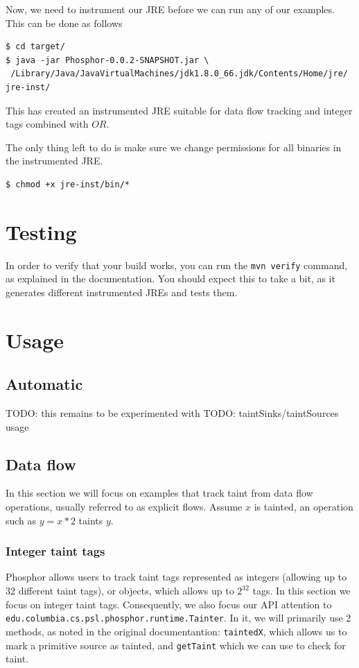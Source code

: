 \documentclass[a4paper]{article}
\begin{document}
Now, we need to instrument our JRE before we can run any of our examples. This can be done
as follows

\begin{lstlisting}
$ cd target/
$ java -jar Phosphor-0.0.2-SNAPSHOT.jar \
 /Library/Java/JavaVirtualMachines/jdk1.8.0_66.jdk/Contents/Home/jre/ jre-inst/
\end{lstlisting}

This has created an instrumented JRE suitable for data flow tracking and integer
tags combined with $OR$.

The only thing left to do is make sure we change permissions for all binaries in
the instrumented JRE.

\begin{lstlisting}
$ chmod +x jre-inst/bin/*
\end{lstlisting}

\section{Testing}
In order to verify that your build works, you can run the \verb|mvn verify| command, as explained in the documentation.
You should expect this to take a bit, as it generates different instrumented JREs and tests them.



\section{Usage}
\subsection{Automatic}
TODO: this remains to be experimented with
TODO: taintSinks/taintSources usage


\subsection{Data flow}
In this section we will focus on examples that track taint from data flow operations, usually referred to as 
explicit flows\cite{denning1976lattice}. Assume $x$ is tainted, an operation such as $y = x * 2$ taints $y$.

\subsubsection{Integer taint tags}
Phosphor allows users to track taint tags represented as integers (allowing up to 32 different taint
tags), or objects, which allows up to $2^{32}$ tags. In this section we focus on integer taint tags.
Consequently, we also focus our API attention to \verb|edu.columbia.cs.psl.phosphor.runtime.Tainter|.
In it, we will primarily use 2 methods, as noted in the
original documentantion: \verb|taintedX|, which allows us to mark a primitive source as tainted, and
\verb|getTaint| which we can use to check for taint.
\end{document}
